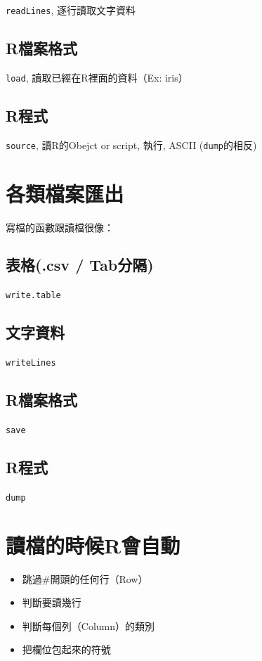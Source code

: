 \documentclass[]{book}
\providecommand{\tightlist}{%
  \setlength{\itemsep}{0pt}\setlength{\parskip}{0pt}}
\theoremstyle{definition}
\theoremstyle{definition}
\theoremstyle{remark}
\begin{document}
\texttt{readLines}, 逐行讀取文字資料

\subsection{R檔案格式}\label{r}

\texttt{load}, 讀取已經在R裡面的資料（Ex: iris）

\subsection{R程式}\label{r}

\texttt{source}, 讀R的Obejct or script, 執行, ASCII
(\texttt{dump}的相反)

\section{各類檔案匯出}

寫檔的函數跟讀檔很像：

\subsection{表格(.csv / Tab分隔)}\label{.csv-tab}

\texttt{write.table}

\subsection{文字資料}\label{-1}

\texttt{writeLines}

\subsection{R檔案格式}\label{r-1}

\texttt{save}

\subsection{R程式}\label{r-1}

\texttt{dump}

\section{讀檔的時候R會自動}\label{r}

\begin{itemize}
\tightlist
\item
  跳過\#開頭的任何行（Row）
\item
  判斷要讀幾行
\item
  判斷每個列（Column）的類別
\item
  把欄位包起來的符號
\end{itemize}
\end{document}
